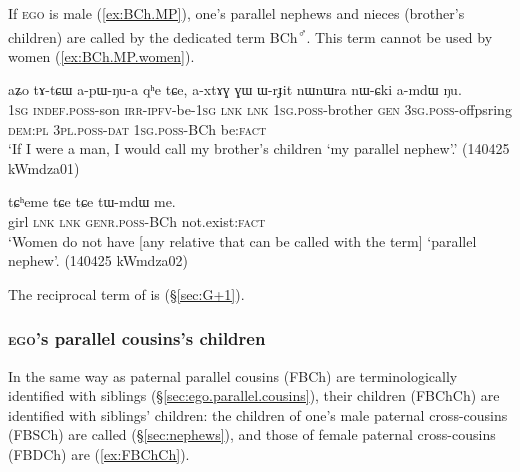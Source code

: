 If \textsc{ego} is male (\ref{ex:BCh.MP}), one's parallel nephews and nieces (brother's children) are called by the dedicated term  BCh\textsuperscript{♂}. This term cannot be used by women (\ref{ex:BCh.MP.women}). 

\begin{exe}
\ex \label{ex:BCh.MP}
\gll  aʑo tɤ-tɕɯ a-pɯ-ŋu-a qʰe tɕe, a-xtɤɣ ɣɯ ɯ-rɟit nɯnɯra nɯ-ɕki a-mdɯ ŋu. \\
\textsc{1sg} \textsc{indef}.\textsc{poss}-son \textsc{irr}-\textsc{ipfv}-be-\textsc{1sg} \textsc{lnk} \textsc{lnk} \textsc{1sg}.\textsc{poss}-brother \textsc{gen} \textsc{3sg}.\textsc{poss}-offpsring \textsc{dem}:\textsc{pl} \textsc{3pl}.\textsc{poss}-\textsc{dat} \textsc{1sg}.\textsc{poss}-BCh be:\textsc{fact} \\
\glt `If I were a man, I would call my brother's children  `my parallel nephew'.' (140425 kWmdza01)
\end{exe}


\begin{exe}
\ex \label{ex:BCh.MP.women}
\gll tɕʰeme tɕe tɕe tɯ-mdɯ me. \\
girl \textsc{lnk} \textsc{lnk} \textsc{genr}.\textsc{poss}-BCh not.exist:\textsc{fact} \\
\glt `Women do not have [any relative that can be called with the term]  `parallel nephew'. (140425 kWmdza02)
\end{exe}

The reciprocal term of  is  (§\ref{sec:G+1}).

\subsubsection{\textsc{ego}'s parallel cousins's children} \label{sec:FBCh.MZCh.Ch}
In the same way as paternal parallel cousins (FBCh) are terminologically identified with siblings (§\ref{sec:ego.parallel.cousins}), their children (FBChCh) are identified with siblings' children: the children of one's male paternal cross-cousins (FBSCh) are called  (§\ref{sec:nephews}), and those of female paternal cross-cousins (FBDCh) are  (\ref{ex:FBChCh}).

